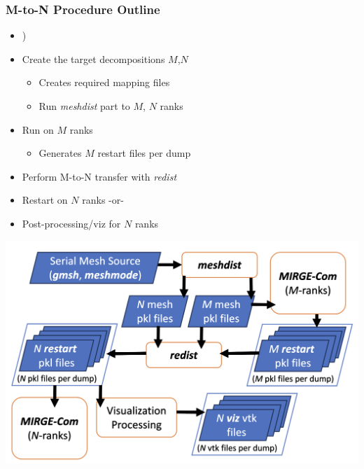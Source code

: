 \begin{frame}\frametitle{M-to-N Procedure Outline}
\begin{minipage}{0.49\textwidth}
\begin{itemize}
\item {)}
\item Create the target decompositions $M$,$N$
  \begin{itemize}
  \item Creates required mapping files
  \item Run \textit{meshdist} part to $M$, $N$ ranks
  \end{itemize}
\color{lightgray}
\item Run \mirgecom{} on $M$ ranks
\begin{itemize}
\color{lightgray}
\item Generates $M$ restart files per dump
\end{itemize}
\item Perform M-to-N transfer with \textit{redist}
\item Restart \mirgecom{} on $N$ ranks -or-
\item Post-processing/viz for $N$ ranks
\end{itemize}
\end{minipage}
\hfill
\begin{minipage}{.49\textwidth}
\includegraphics[width=\textwidth]{Figures/mtc/redist_data_flow_full.png}
\end{minipage}
\end{frame}

